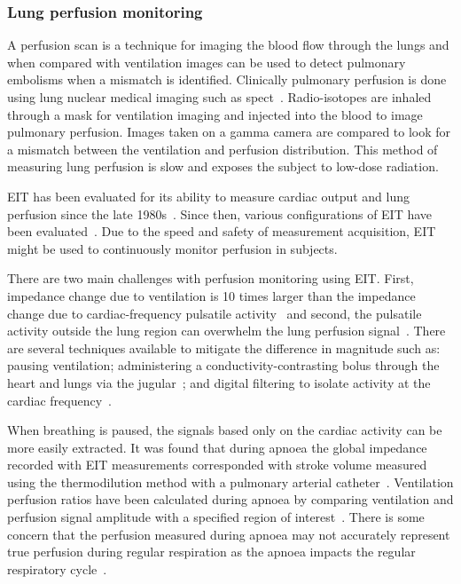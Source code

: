 \subsubsection{Lung perfusion monitoring}
A perfusion scan is a technique for imaging the blood flow through the lungs
and when compared with ventilation images can be used to detect pulmonary embolisms
when a mismatch is identified. Clinically pulmonary perfusion is done using 
lung nuclear medical imaging such as \acrfull{spect}~\parencite{Parker2012}. Radio-isotopes are inhaled through a mask 
for ventilation imaging and injected into the blood to image pulmonary perfusion. 
Images taken on a gamma camera are compared to look for a mismatch between the ventilation
and perfusion distribution. This method of 
measuring lung perfusion is slow and exposes the subject to low-dose radiation.

EIT has been evaluated for its ability to measure cardiac output and
lung perfusion since the late 1980s~\parencite{Eyuboglu1989,Blottt1992,Brown1992,Frerichs2002}. 
Since then, various configurations of EIT have been evaluated~\parencite{Borges2012,Nguyen2015}.
Due to the speed and safety of measurement acquisition, EIT might be used to continuously monitor 
perfusion in subjects.

There are two main challenges with perfusion monitoring using EIT. First, impedance change due to ventilation 
is 10 times larger than the impedance change due to cardiac-frequency pulsatile activity~\parencite{Deibele2008}
and second, the pulsatile activity outside the lung region can overwhelm the lung perfusion signal~\parencite{Stowe2019}. 
There are several techniques available to mitigate the difference 
in magnitude such as: pausing ventilation; administering a 
conductivity-contrasting bolus through the heart and lungs via the jugular~\parencite{Frerichs2002};
and digital filtering to isolate activity at the cardiac frequency~\parencite{Leathard1994}. 

When breathing is paused, the signals based only on the cardiac activity can be more easily extracted. 
It was found that during apnoea the global impedance recorded with EIT measurements corresponded with stroke volume 
measured using the 
thermodilution method with a pulmonary arterial catheter~\parencite{Fagerberg2009}.
Ventilation perfusion ratios have been calculated during apnoea by comparing 
ventilation and perfusion signal amplitude with a specified region of 
interest~\parencite{Fagerberg2009a}.
There is some concern that the perfusion measured during apnoea may not accurately represent 
true perfusion during regular respiration as the apnoea impacts the regular respiratory cycle~\parencite{Leonhardt2012}.

